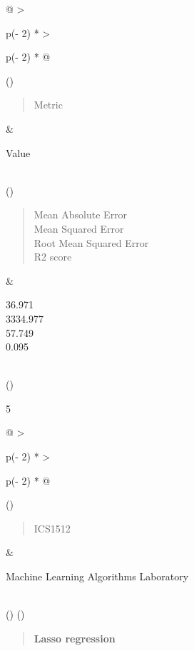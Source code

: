\documentclass[
]{article}
\begin{document}
\begin{longtable}[]{@{}
  >{\raggedright\arraybackslash}p{(\columnwidth - 2\tabcolsep) * }
  >{\raggedright\arraybackslash}p{(\columnwidth - 2\tabcolsep) * }@{}}
\toprule()
\begin{minipage}[b]{\linewidth}\raggedright
\begin{quote}
Metric
\end{quote}
\end{minipage} & \begin{minipage}[b]{\linewidth}\raggedright
Value
\end{minipage} \\
\midrule()
\endhead
\begin{minipage}[t]{\linewidth}\raggedright
\begin{quote}
Mean Absolute Error\\
Mean Squared Error\\
Root Mean Squared Error\\
R2 score
\end{quote}\strut
\end{minipage} & \begin{minipage}[t]{\linewidth}\raggedright
36.971\\
3334.977\\
57.749\\
0.095\strut
\end{minipage} \\
\bottomrule()
\end{longtable}

5

\begin{longtable}[]{@{}
  >{\raggedright\arraybackslash}p{(\columnwidth - 2\tabcolsep) * }
  >{\raggedright\arraybackslash}p{(\columnwidth - 2\tabcolsep) * }@{}}
\toprule()
\begin{minipage}[b]{\linewidth}\raggedright
\begin{quote}
ICS1512
\end{quote}
\end{minipage} & \begin{minipage}[b]{\linewidth}\raggedright
Machine Learning Algorithms Laboratory
\end{minipage} \\
\midrule()
\endhead
\bottomrule()
\end{longtable}

\begin{quote}
\textbf{Lasso regression}
\end{quote}
\end{document}
